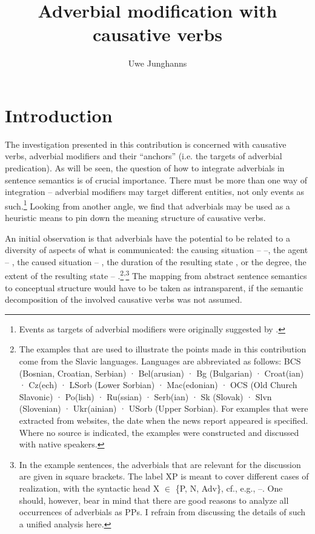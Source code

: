 \documentclass[output=paper]{langscibook}
\author{Uwe Junghanns\orcid{}\affiliation{University of Göttingen}}
\title{Adverbial modification with causative verbs}
\begin{document}
\maketitle

\section{Introduction}

The investigation presented in this contribution is concerned with causative verbs, adverbial modifiers and their “anchors” (i.e. the targets of adverbial predication). As will be seen, the question of how to integrate adverbials in sentence semantics is of crucial importance. There must be more than one way of integration -- adverbial modifiers may target different entities, not only events as such.\footnote{Events as targets of adverbial modifiers were originally suggested by \citet{Davidson1967a}.} Looking from another angle, we find that adverbials may be used as a heuristic means to pin down the meaning structure of causative verbs.

\largerpage
An initial observation is that adverbials have the potential to be related to a diversity of aspects of what is communicated: the causing situation -- --, the agent -- , the caused situation -- , the duration of the resulting state , or the degree, the extent of the resulting state – .\footnote{The examples that are used to illustrate the points made in this contribution come from the Slavic languages. Languages are abbreviated as follows: BCS (Bosnian, Croatian, Serbian) · Bel(arusian) · Bg (Bulgarian) · Croat(ian) · Cz(ech) · LSorb (Lower Sorbian) · Mac(edonian) · OCS (Old Church Slavonic) · Po(lish) · Ru(ssian) · Serb(ian)  · Sk (Slovak) · Slvn (Slovenian) · Ukr(ainian) · USorb (Upper Sorbian). For examples that were extracted from websites, the date when the news report appeared is specified. Where no source is indicated, the examples were constructed and discussed with native speakers.}\textsuperscript{,}\footnote{In the example sentences, the adverbials that are relevant for the discussion are given in square brackets. The label XP is meant to cover different cases of realization, with the syntactic head X \textrm{${\in}$} \{P, N, Adv\}, cf., e.g., --. One should, however, bear in mind that there are good reasons to analyze all occurrences of adverbials as PPs. I refrain from discussing the details of such a unified analysis here.} The mapping from abstract sentence semantics to conceptual structure would have to be taken as intransparent, if the semantic decomposition of the involved causative verbs was not assumed.
\end{document}
